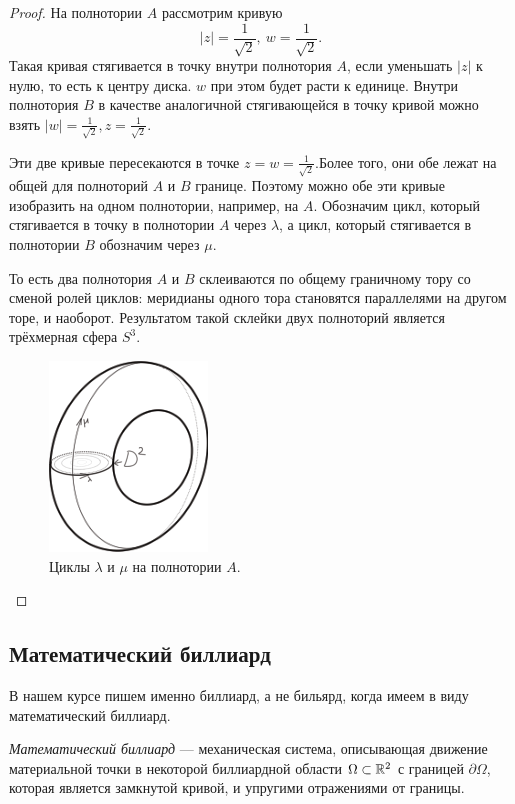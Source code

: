 \begin{proof}
    На полнотории $A$ рассмотрим кривую
    \[|z| = \frac{1}{\sqrt2}, \ w = \frac{1}{\sqrt2}.\]
    Такая кривая стягивается в точку внутри полнотория $A$, если уменьшать $|z|$ к нулю, то есть к центру диска. $w$ при этом будет расти к единице. Внутри полнотория $B$ в качестве аналогичной стягивающейся в точку кривой можно взять $|w| = \frac{1}{\sqrt2}, z = \frac{1}{\sqrt2}$.

    Эти две кривые пересекаются в точке $z = w = \frac{1}{\sqrt2}$.Более того, они обе лежат на общей для полноторий $A$ и $B$ границе. Поэтому можно обе эти кривые изобразить на одном полнотории, например, на $A$. Обозначим цикл, который стягивается в точку в полнотории $A$ через $\lambda$, а цикл, который стягивается в полнотории $B$ обозначим через $\mu$.

    То есть два полнотория $A$ и $B$ склеиваются по общему граничному тору со сменой ролей циклов: меридианы одного тора становятся параллелями на другом торе, и наоборот. Результатом такой склейки двух полноторий является трёхмерная сфера $S^3$.

    \begin{figure}[ht]
        \centering
        \includegraphics[scale=0.8]{images/c15.8.png}
        \caption{Циклы $\lambda$ и $\mu$ на полнотории $A$.}
        \label{fig:c15.8}
    \end{figure}
\end{proof} 


\subsection{Математический биллиард}
В нашем курсе пишем именно биллиард, а не бильярд, когда имеем в виду математический биллиард.
\begin{definition}
    \textit{Математический биллиард} — механическая система, описывающая движение материальной точки в некоторой биллиардной области $\Omega \subset \mathbb{R}^2$ с границей $\partial \Omega$, которая является замкнутой кривой, и упругими отражениями от границы.
\end{definition} 

